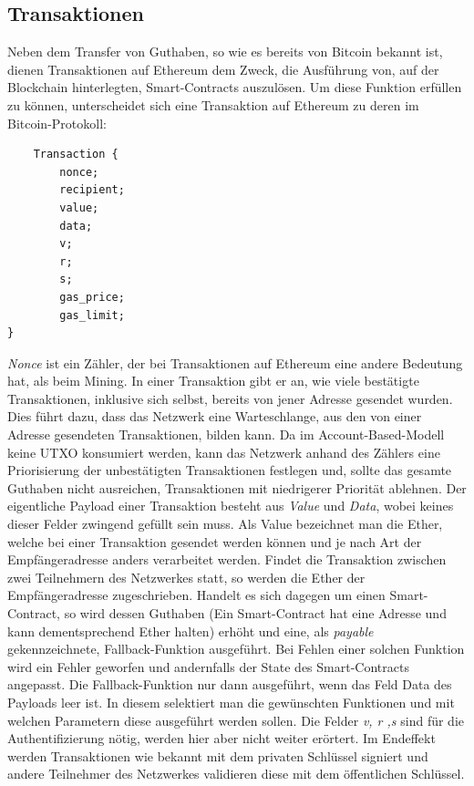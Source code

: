 \subsection{Transaktionen}
Neben dem Transfer von Guthaben, so wie es bereits von Bitcoin bekannt ist, dienen Transaktionen auf Ethereum dem Zweck, die Ausführung von, auf der Blockchain hinterlegten, Smart-Contracts auszulösen.
Um diese Funktion erfüllen zu können, unterscheidet sich eine Transaktion auf Ethereum zu deren im Bitcoin-Protokoll:
\begin{lstlisting}
	Transaction {
		nonce;
		recipient;
		value;
		data;
		v;
		r;
		s;	
		gas_price;
		gas_limit;
}
\end{lstlisting}
\emph{Nonce} ist ein Zähler, der bei Transaktionen auf Ethereum eine andere Bedeutung hat, als beim Mining. In einer Transaktion gibt er an, wie viele bestätigte Transaktionen, inklusive sich selbst, bereits von jener Adresse gesendet wurden. Dies führt dazu, dass das Netzwerk eine Warteschlange, aus den von einer Adresse gesendeten Transaktionen, bilden kann. Da im Account-Based-Modell keine UTXO konsumiert werden, kann das Netzwerk anhand des Zählers eine Priorisierung der unbestätigten Transaktionen festlegen und, sollte das gesamte Guthaben nicht ausreichen, Transaktionen mit niedrigerer Priorität ablehnen.
Der eigentliche Payload einer Transaktion besteht aus \emph{Value} und \emph{Data}, wobei keines dieser Felder zwingend gefüllt sein muss.
Als Value bezeichnet man die Ether, welche bei einer Transaktion gesendet werden können und je nach Art der Empfängeradresse anders verarbeitet werden. Findet die Transaktion zwischen zwei Teilnehmern des Netzwerkes statt, so werden die Ether der Empfängeradresse zugeschrieben. Handelt es sich dagegen um einen Smart-Contract, so wird dessen Guthaben (Ein Smart-Contract hat eine Adresse und kann dementsprechend Ether halten) erhöht und eine, als \emph{payable} gekennzeichnete, Fallback-Funktion ausgeführt. Bei Fehlen einer solchen Funktion wird ein Fehler geworfen und andernfalls der State des Smart-Contracts angepasst.
Die Fallback-Funktion nur dann ausgeführt, wenn das Feld Data des Payloads leer ist. In diesem selektiert man die gewünschten Funktionen und mit welchen Parametern diese ausgeführt werden sollen. Die Felder \emph{v, r ,s} sind für die Authentifizierung nötig, werden hier aber nicht weiter erörtert. Im Endeffekt werden Transaktionen wie bekannt mit dem privaten Schlüssel signiert und andere Teilnehmer des Netzwerkes validieren diese mit dem öffentlichen Schlüssel.\\
